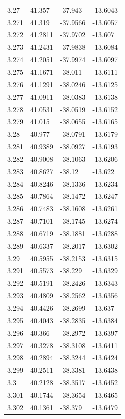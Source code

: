 \begin{tabular}{llll}
3.27 & 41.357 & -37.943 & -13.6043 \\
3.271 & 41.319 & -37.9566 & -13.6057 \\
3.272 & 41.2811 & -37.9702 & -13.607 \\
3.273 & 41.2431 & -37.9838 & -13.6084 \\
3.274 & 41.2051 & -37.9974 & -13.6097 \\
3.275 & 41.1671 & -38.011 & -13.6111 \\
3.276 & 41.1291 & -38.0246 & -13.6125 \\
3.277 & 41.0911 & -38.0383 & -13.6138 \\
3.278 & 41.0531 & -38.0519 & -13.6152 \\
3.279 & 41.015 & -38.0655 & -13.6165 \\
3.28 & 40.977 & -38.0791 & -13.6179 \\
3.281 & 40.9389 & -38.0927 & -13.6193 \\
3.282 & 40.9008 & -38.1063 & -13.6206 \\
3.283 & 40.8627 & -38.12 & -13.622 \\
3.284 & 40.8246 & -38.1336 & -13.6234 \\
3.285 & 40.7864 & -38.1472 & -13.6247 \\
3.286 & 40.7483 & -38.1608 & -13.6261 \\
3.287 & 40.7101 & -38.1745 & -13.6274 \\
3.288 & 40.6719 & -38.1881 & -13.6288 \\
3.289 & 40.6337 & -38.2017 & -13.6302 \\
3.29 & 40.5955 & -38.2153 & -13.6315 \\
3.291 & 40.5573 & -38.229 & -13.6329 \\
3.292 & 40.5191 & -38.2426 & -13.6343 \\
3.293 & 40.4809 & -38.2562 & -13.6356 \\
3.294 & 40.4426 & -38.2699 & -13.637 \\
3.295 & 40.4043 & -38.2835 & -13.6384 \\
3.296 & 40.366 & -38.2972 & -13.6397 \\
3.297 & 40.3278 & -38.3108 & -13.6411 \\
3.298 & 40.2894 & -38.3244 & -13.6424 \\
3.299 & 40.2511 & -38.3381 & -13.6438 \\
3.3 & 40.2128 & -38.3517 & -13.6452 \\
3.301 & 40.1744 & -38.3654 & -13.6465 \\
3.302 & 40.1361 & -38.379 & -13.6479 \\

\end{tabular}
